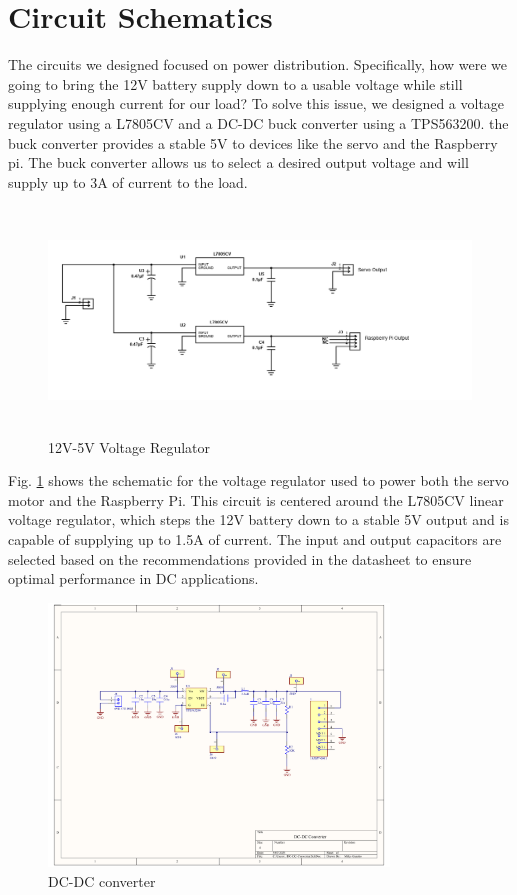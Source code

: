 \section{Circuit Schematics}

The circuits we designed focused on power distribution. Specifically, how were we going to bring the 12V battery supply down to a usable voltage while still supplying enough current for our load? To solve this issue, we designed a voltage regulator using a L7805CV and a DC-DC buck converter using a TPS563200. the buck converter provides a stable 5V to devices like the servo and the Raspberry pi. The buck converter allows us to select a desired output voltage and will supply up to 3A of current to the load.
\begin{figure}[H]
    \centering
    \includegraphics[height=6cm]{Voltage Regulator.png}
     \caption{12V-5V Voltage Regulator}
    \label{fig:Voltage Regulator}
\end{figure}
Fig. \ref{fig:Voltage Regulator} shows the schematic for the voltage regulator used to power both the servo motor and the Raspberry Pi. This circuit is centered around the L7805CV linear voltage regulator, which steps the 12V battery down to a stable 5V output and is capable of supplying up to 1.5A of current. The input and output capacitors are selected based on the recommendations provided in the datasheet to ensure optimal performance in DC applications.
\begin{figure}[H]
    \centering
    \includegraphics[height=7cm]{DC-DC converter.pdf}
     \caption{DC-DC converter}
    \label{fig:DC-DC Converter}
\end{figure}
